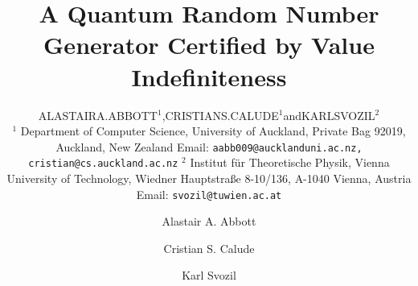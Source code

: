 \documentclass{mscs}
\begin{document}
\title{A Quantum Random Number Generator Certified by Value Indefiniteness}

\author[A. A. Abbott, C. S. Calude and K. Svozil]{A\ls L\ls A\ls S\ls T\ls A\ls I\ls R\ns A.\ns A\ls B\ls B\ls O\ls T\ls T$^1$,\ns C\ls R\ls I\ls S\ls T\ls I\ls A\ls N\ns S.\ns C\ls A\ls L\ls U\ls D\ls E$^1$\ns and\ns K\ls A\ls R\ls L\ns S\ls V\ls O\ls Z\ls I\ls L$^2$\\
$^1$ Department of Computer Science,
University of Auckland,\addressbreak
Private Bag 92019, Auckland, New Zealand\addressbreak
Email: {\tt aabb009@aucklanduni.ac.nz, cristian@cs.auckland.ac.nz}
\addressbreak $^2$ Institut f\"ur Theoretische Physik, Vienna University of Technology,\addressbreak
Wiedner Hauptstra\ss e 8-10/136, A-1040 Vienna, Austria\addressbreak
Email: {\tt svozil@tuwien.ac.at}
}

\author{Alastair A. Abbott}
\author{Cristian S. Calude}

\author{Karl Svozil}
\fi

\maketitle
\end{document}
